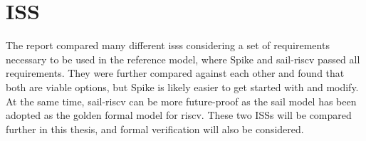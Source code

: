 \section{ISS}
\label{sec:pw_iss}

The report compared many different \acrshort{iss}s considering a set of requirements necessary to be used in the reference model, where Spike \cite{SpikeRISCVISA2023} and sail-riscv \cite{RISCVSailModel2023} passed all requirements. They were further compared against each other and found that both are viable options, but Spike is likely easier to get started with and modify. At the same time, sail-riscv can be more future-proof as the sail model has been adopted as the golden formal model for \acrshort{riscv}. These two ISSs will be compared further in this thesis, and formal verification will also be considered.




